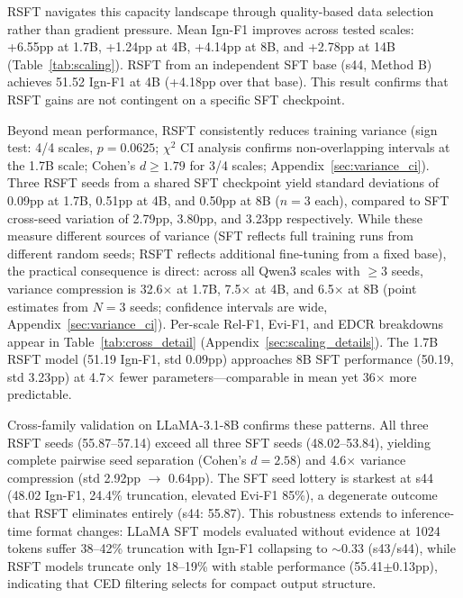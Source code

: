 RSFT navigates this capacity landscape through quality-based data selection rather than gradient pressure. Mean Ign-F1 improves across tested scales: +6.55pp at 1.7B, +1.24pp at 4B, +4.14pp at 8B, and +2.78pp at 14B (Table~\ref{tab:scaling}). RSFT from an independent SFT base (s44, Method B) achieves 51.52 Ign-F1 at 4B (+4.18pp over that base). This result confirms that RSFT gains are not contingent on a specific SFT checkpoint.

Beyond mean performance, RSFT consistently reduces training variance (sign test: 4/4 scales, $p{=}0.0625$; $\chi^2$ CI analysis confirms non-overlapping intervals at the 1.7B scale; Cohen's $d \geq 1.79$ for 3/4 scales; Appendix~\ref{sec:variance_ci}). Three RSFT seeds from a shared SFT checkpoint yield standard deviations of 0.09pp at 1.7B, 0.51pp at 4B, and 0.50pp at 8B ($n{=}3$ each), compared to SFT cross-seed variation of 2.79pp, 3.80pp, and 3.23pp respectively. While these measure different sources of variance (SFT reflects full training runs from different random seeds; RSFT reflects additional fine-tuning from a fixed base), the practical consequence is direct: across all Qwen3 scales with $\geq$3 seeds, variance compression is 32.6$\times$ at 1.7B, 7.5$\times$ at 4B, and 6.5$\times$ at 8B (point estimates from $N{=}3$ seeds; confidence intervals are wide, Appendix~\ref{sec:variance_ci}). Per-scale Rel-F1, Evi-F1, and EDCR breakdowns appear in Table~\ref{tab:cross_detail} (Appendix~\ref{sec:scaling_details}). The 1.7B RSFT model (51.19 Ign-F1, std 0.09pp) approaches 8B SFT performance (50.19, std 3.23pp) at 4.7$\times$ fewer parameters---comparable in mean yet 36$\times$ more predictable.

Cross-family validation on LLaMA-3.1-8B confirms these patterns. All three RSFT seeds (55.87--57.14) exceed all three SFT seeds (48.02--53.84), yielding complete pairwise seed separation (Cohen's $d{=}2.58$) and 4.6$\times$ variance compression (std 2.92pp $\to$ 0.64pp). The SFT seed lottery is starkest at s44 (48.02 Ign-F1, 24.4\% truncation, elevated Evi-F1 85\%), a degenerate outcome that RSFT eliminates entirely (s44: 55.87). This robustness extends to inference-time format changes: LLaMA SFT models evaluated without evidence at 1024 tokens suffer 38--42\% truncation with Ign-F1 collapsing to ${\sim}$0.33 (s43/s44), while RSFT models truncate only 18--19\% with stable performance (55.41$\pm$0.13pp), indicating that CED filtering selects for compact output structure.

